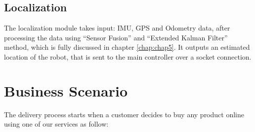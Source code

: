 \subsection{Localization}
\hspace{2cm}The localization module takes input: IMU, GPS and Odometry data, after processing the data using “Sensor Fusion” and “Extended Kalman Filter”  method, which is fully discussed in chapter \ref{chap:chap5}. It outputs an estimated location of the robot, that is sent to the main controller over a socket connection.

 
 \section{Business Scenario}
 \hspace{2cm}The delivery process starts when a customer decides to buy any product online using one of our services as follow:
